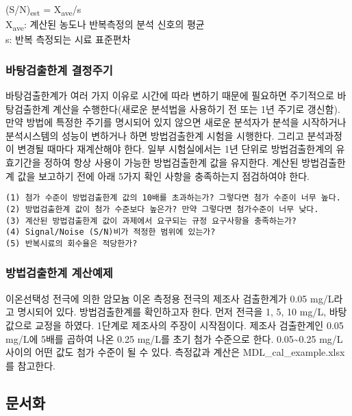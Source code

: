 \documentclass[
]{book}
\begin{document}
(S/N)\textsubscript{est} = X\textsubscript{ave}/s\\
X\textsubscript{ave}: 계산된 농도나 반복측정의 분석 신호의 평균\\
s: 반복 측정되는 시료 표준편차

\hypertarget{uxbc14uxd0d5uxac80uxcd9cuxd55cuxacc4-uxacb0uxc815uxc8fcuxae30}{%
\subsubsection{바탕검출한계 결정주기}\label{uxbc14uxd0d5uxac80uxcd9cuxd55cuxacc4-uxacb0uxc815uxc8fcuxae30}}

바탕검출한계가 여러 가지 이유로 시간에 따라 변하기 때문에 필요하면 주기적으로 바탕검출한계 계산을 수행한다(새로운 분석법을 사용하기 전 또는 1년 주기로 갱신함). 만약 방법에 특정한 주기를 명시되어 있지 않으면 새로운 분석자가 분석을 시작하거나 분석시스템의 성능이 변하거나 하면 방법검출한계 시험을 시행한다. 그리고 분석과정이 변경될 때마다 재계산해야 한다. 일부 시험실에서는 1년 단위로 방법검출한계의 유효기간을 정하여 항상 사용이 가능한 방법검출한계 값을 유지한다.
계산된 방법검출한계 값을 보고하기 전에 아래 5가지 확인 사항을 충족하는지 점검하여야 한다.

\begin{verbatim}
(1) 첨가 수준이 방법검출한계 값의 10배를 초과하는가? 그렇다면 첨가 수준이 너무 높다.  
(2) 방법검출한계 값이 첨가 수준보다 높은가? 만약 그렇다면 첨가수준이 너무 낮다.  
(3) 계산된 방법검출한계 값이 과제에서 요구되는 규정 요구사항을 충족하는가?  
(4) Signal/Noise (S/N)비가 적정한 범위에 있는가?  
(5) 반복시료의 회수율은 적당한가?    
\end{verbatim}

\hypertarget{uxbc29uxbc95uxac80uxcd9cuxd55cuxacc4-uxacc4uxc0b0uxc608uxc81c}{%
\subsubsection{방법검출한계 계산예제}\label{uxbc29uxbc95uxac80uxcd9cuxd55cuxacc4-uxacc4uxc0b0uxc608uxc81c}}

이온선택성 전극에 의한 암모늄 이온 측정용 전극의 제조사 검출한계가 0.05 mg/L라고 명시되어 있다. 방법검출한계를 확인하고자 한다. 먼저 전극을 1, 5, 10 mg/L, 바탕값으로 교정을 하였다. 1단계로 제조사의 주장이 시작점이다. 제조사 검출한계인 0.05 mg/L에 5배를 곱하여 나온 0.25 mg/L를 초기 첨가 수준으로 한다. 0.05\textasciitilde0.25 mg/L사이의 어떤 값도 첨가 수준이 될 수 있다. 측정값과 계산은 MDL\_cal\_example.xlsx를 참고한다.

\hypertarget{uxbb38uxc11cuxd654}{%
\subsection{문서화}\label{uxbb38uxc11cuxd654}}
\end{document}
